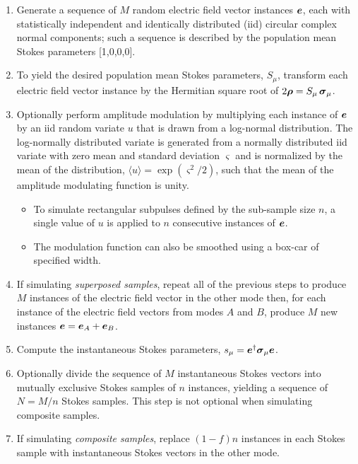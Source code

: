 \documentclass[12pt]{article}
\newcommand{\mbf}[1]{\mbox{\boldmath $#1$}}
\newcommand{\irow}{\mu} \newcommand{\icol}{\nu}
\newcommand{\pauli}[1]{\ensuremath{\mbf{\sigma}_{#1}}}
\begin{document}
\begin{enumerate}
\item Generate a sequence of $M$ random electric field vector
  instances $\mbf{e}$, each with statistically independent and
  identically distributed (iid) circular complex normal components;
  such a sequence is described by the population mean Stokes
  parameters [1,0,0,0].
  
\item To yield the desired population mean Stokes parameters, $S_\irow$,
  transform each electric field vector instance by the Hermitian square
  root of $2\mbf\rho=S_\irow\,\pauli{\irow}$.

\item Optionally perform amplitude modulation by multiplying each
  instance of $\mbf{e}$ by an iid random variate $u$ that is drawn
  from a log-normal distribution.  The log-normally distributed
  variate is generated from a normally distributed iid variate with
  zero mean and standard deviation $\varsigma$ and is normalized by
  the mean of the distribution, $\langle u \rangle =
  \exp(\varsigma^2/2)$, such that the mean of the amplitude modulating
  function is unity.
  \begin{itemize}
  \item
  To simulate rectangular subpulses defined by the sub-sample size $n$, a
  single value of $u$ is applied to $n$ consecutive instances of
  $\mbf{e}$.
  \item
  The modulation function can also be smoothed using a box-car of specified
  width.
  \end{itemize}
  
\item If simulating \emph{superposed samples}, repeat all of the previous
  steps to produce $M$ instances of the electric field vector in the
  other mode then, for each instance of the electric field vectors
  from modes $A$ and $B$, produce $M$ new instances
  $\mbf{e}=\mbf{e}_A+\mbf{e}_B$.
  
\item Compute the instantaneous Stokes parameters,
  $s_\irow=\mbf{e}^\dagger\pauli{\irow}\mbf{e}$.

\item Optionally divide the sequence of $M$ instantaneous Stokes
  vectors into mutually exclusive Stokes samples of $n$ instances,
  yielding a sequence of $N=M/n$ Stokes samples.  This step is not
  optional when simulating composite samples.

\item If simulating \emph{composite samples}, replace $(1-f)n$ instances
  in each Stokes sample with instantaneous Stokes vectors in the
  other mode.


\end{enumerate}
\end{document}
